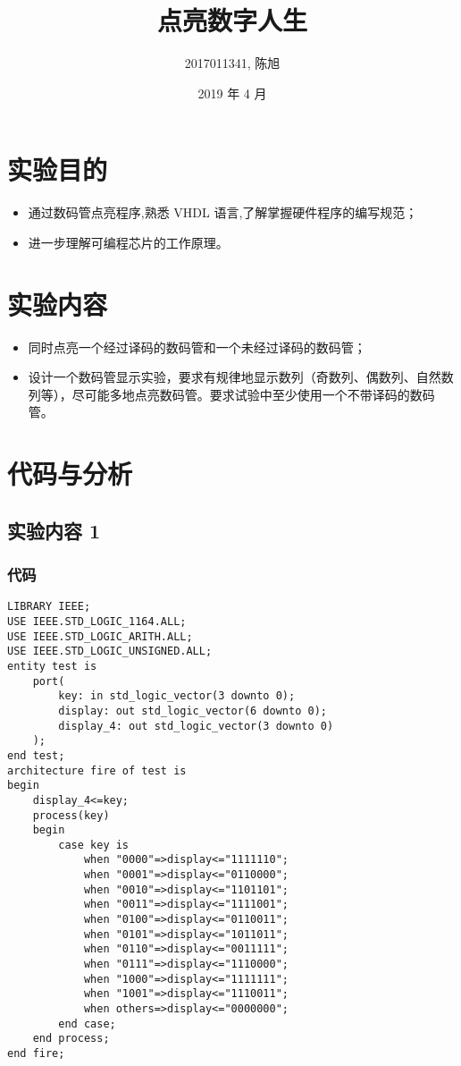 \documentclass[a4paper]{article}
\title{点亮数字人生}
\author{2017011341, 陈旭}
\date{2019 年 4 月}
\begin{document}
\maketitle

\section{实验目的}

    \begin{itemize}
        \item 通过数码管点亮程序,熟悉 VHDL 语言,了解掌握硬件程序的编写规范；
        \item 进一步理解可编程芯片的工作原理。
    \end{itemize}

\section{实验内容}

    \begin{itemize}
        \item 同时点亮一个经过译码的数码管和一个未经过译码的数码管；
        \item 设计一个数码管显示实验，要求有规律地显示数列（奇数列、偶数列、自然数列等），尽可能多地点亮数码管。要求试验中至少使用一个不带译码的数码管。
    \end{itemize}

\section{代码与分析}

    \subsection{实验内容 1}

        \subsubsection{代码}

        \begin{lstlisting}
LIBRARY IEEE;
USE IEEE.STD_LOGIC_1164.ALL;
USE IEEE.STD_LOGIC_ARITH.ALL;
USE IEEE.STD_LOGIC_UNSIGNED.ALL;
entity test is
    port(
        key: in std_logic_vector(3 downto 0);
        display: out std_logic_vector(6 downto 0);
        display_4: out std_logic_vector(3 downto 0)
    );
end test;
architecture fire of test is
begin
    display_4<=key;
    process(key)
    begin
        case key is
            when "0000"=>display<="1111110";
            when "0001"=>display<="0110000";
            when "0010"=>display<="1101101";
            when "0011"=>display<="1111001";
            when "0100"=>display<="0110011";
            when "0101"=>display<="1011011";
            when "0110"=>display<="0011111";
            when "0111"=>display<="1110000";
            when "1000"=>display<="1111111";
            when "1001"=>display<="1110011";
            when others=>display<="0000000";
        end case;
    end process;
end fire;
            \end{lstlisting}
\end{document}
